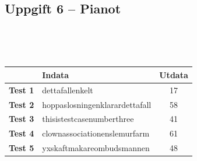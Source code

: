 \documentclass[a4paper,12pt,oneside]{amsbook}
\theoremstyle{test}
\newcommand{\fe}[1]{\textbf{#1}}            %
\begin{document}
\subsection*{Uppgift 6 -- Pianot}
~\\
{\tt 
\begin{tabular}{||l||l||c||}\hline\hline
& {\fe{Indata}} & \fe{Utdata} \\ \hline \hline
\fe{Test 1} & dettafallenkelt & 17 \\ \hline
\fe{Test 2} & hoppaslosningenklarardettafall & 58 \\ \hline
\fe{Test 3} & thisistestcasenumberthree & 41 \\ \hline
\fe{Test 4} & clownassociationenslemurfarm & 61\\ \hline
\fe{Test 5} & yxskaftmakareombudsmannen & 48\\ \hline\hline
\end{tabular}
}
\end{document}

